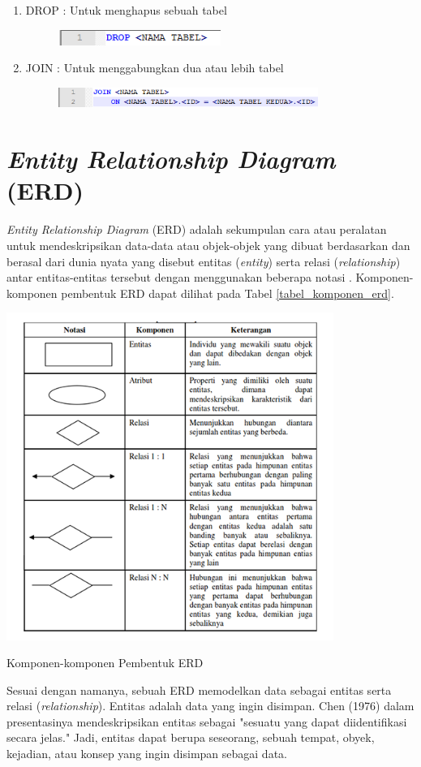 \begin{enumerate}
\begin{figure}[H]
		\end{figure} 
		\item
		DROP : Untuk menghapus sebuah tabel
		\begin{figure}[H]
			\includegraphics[width=0.5\textwidth]{gambar/sql/drop}
		\end{figure}
		\item
		JOIN : Untuk menggabungkan dua atau lebih tabel
		\begin{figure}[H]
			\includegraphics[width=0.8\textwidth]{gambar/sql/join}
		\end{figure}
	\end{enumerate}
		
\section{\emph{Entity Relationship Diagram} (ERD)}
	\emph{Entity Relationship Diagram} (ERD) adalah sekumpulan cara atau peralatan untuk mendeskripsikan data-data atau objek-objek yang dibuat berdasarkan dan berasal dari dunia nyata yang disebut entitas (\emph{entity}) serta relasi (\emph{relationship}) antar entitas-entitas tersebut dengan menggunakan beberapa notasi \cite{edi}. Komponen-komponen pembentuk ERD dapat dilihat pada Tabel \ref{tabel_komponen_erd}. 
	\begin{table}[H]
		\centering
		\includegraphics[width=0.8\textwidth]{gambar/erd/erd}
		\caption{Komponen-komponen Pembentuk ERD}
		\label{tabel_komponen_erd}
	\end{table}
	Sesuai dengan namanya, sebuah ERD memodelkan data sebagai entitas serta relasi (\emph{relationship}). Entitas adalah data yang ingin disimpan. Chen (1976) dalam presentasinya mendeskripsikan entitas sebagai  "sesuatu yang dapat diidentifikasi secara jelas." Jadi, entitas dapat berupa seseorang, sebuah tempat, obyek, kejadian, atau konsep yang ingin disimpan sebagai data. 
	
